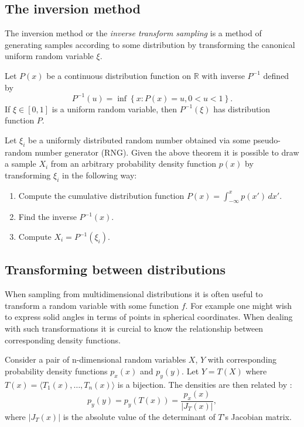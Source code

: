 \subsection{The inversion method}
The inversion method or the \emph{inverse transform sampling} \parencite{devroye86} is a method of generating samples according to some distribution by transforming the canonical uniform random variable $\xi$.
\begin{thm}
  Let $P(x)$ be a continuous distribution function on $\mathbb{R}$ with inverse $P^{-1}$ defined by
  \begin{equation}
    P^{-1}(u) = \inf \left\{ x:P(x)=u, 0 < u < 1 \right\}.
  \end{equation}
If $\xi \in [0,1]$ is a uniform random variable, then $P^{-1}(\xi)$ has distribution function $P$.
\end{thm}

Let $\xi_{i}$ be a uniformly distributed random number obtained via some pseudo-random number generator (RNG). Given the above theorem it is possible to draw a sample $X_{i}$ from an arbitrary probability density function $p(x)$ by transforming $\xi_{i}$ in the following way:
\begin{enumerate}
\item Compute the cumulative distribution function $P(x) = \int_{-\infty}^{x} p(x') \,dx'$.
\item Find the inverse $P^{-1}(x)$.
\item Compute $X_{i} = P^{-1}(\xi_{i})$.
\end{enumerate}

\subsection{Transforming between distributions}
When sampling from multidimensional distributions it is often useful to transform a random variable with some function $f$. For example one might wish to express solid angles in terms of points in spherical coordinates. When dealing with such transformations it is curcial to know the relationship between corresponding density functions.

Consider a pair of n-dimensional random variables $X$, $Y$ with corresponding probability density functions $p_{x}(x)$ and $p_{y}(y)$. Let $Y = T(X)$ where $T(x)=\langle T_{1}(x), \dots, T_{n}(x) \rangle$ is a bijection. The densities are then related by \parencite{phar2010}:
\begin{equation}
  p_{y}(y)=p_{y}(T(x)) = \frac{p_{x}(x)}{|J_{T}(x)|},
\end{equation}
where $|J_{T}(x)|$ is the absolute value of the determinant of $T$'s Jacobian matrix.

